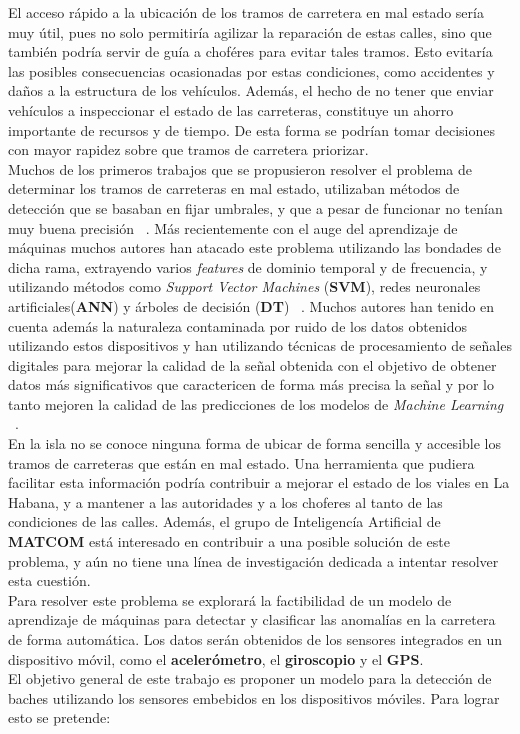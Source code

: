 \indent El acceso rápido a la ubicación de los tramos de carretera en mal estado sería muy útil, pues no solo permitiría agilizar la
reparación de estas calles, sino que también podría servir de guía a choféres para evitar tales tramos. Esto evitaría las posibles
consecuencias ocasionadas por estas condiciones, como accidentes y daños a la estructura de los vehículos. Además, el hecho de no tener que
enviar vehículos a inspeccionar el estado de las carreteras, constituye un ahorro importante de recursos y de tiempo. De esta forma se podrían
tomar decisiones con mayor rapidez sobre que tramos de carretera priorizar.\\
\indent Muchos de los primeros trabajos que se propusieron resolver el problema de determinar los tramos de carreteras en mal estado, utilizaban
métodos de detección que se basaban en fijar umbrales, y que a pesar de funcionar no tenían muy buena precisión ~. Más recientemente con el auge del aprendizaje de máquinas muchos autores han atacado este problema utilizando
las bondades de dicha rama, extrayendo varios \emph{features} de dominio temporal y de frecuencia, y utilizando métodos como \emph{Support Vector
Machines} (\textbf{SVM}), redes neuronales artificiales(\textbf{ANN}) y árboles de decisión (\textbf{DT}) ~. Muchos autores han tenido en cuenta además la naturaleza contaminada por ruido de
los datos obtenidos utilizando estos dispositivos y han utilizando técnicas de procesamiento de señales digitales para mejorar la calidad de la señal
obtenida con el objetivo de obtener datos más significativos que caractericen de forma más precisa la señal y por lo tanto mejoren la calidad de las
predicciones de los modelos de \emph{Machine Learning} ~.\\
\indent En la isla no se conoce ninguna forma de ubicar de forma sencilla y accesible los tramos de carreteras que están en mal estado. Una herramienta
que pudiera facilitar esta información podría contribuir a mejorar el estado de los viales en La Habana, y a mantener a las autoridades y a los choferes
al tanto de las condiciones de las calles. Además, el grupo de Inteligencía Artificial de \textbf{MATCOM} está interesado en contribuir a una posible
solución de este problema, y aún no tiene una línea de investigación dedicada a intentar resolver esta cuestión.\\
\indent Para resolver este problema se explorará la factibilidad de un modelo de aprendizaje de máquinas para detectar y clasificar las anomalías en la
carretera de forma automática. Los datos serán obtenidos de los sensores integrados en un dispositivo móvil, como el \textbf{acelerómetro},
el \textbf{giroscopio} y el \textbf{GPS}.\\
\indent El objetivo general de este trabajo es proponer un modelo para la detección de baches utilizando los sensores embebidos en los
dispositivos móviles. Para lograr esto se pretende:


